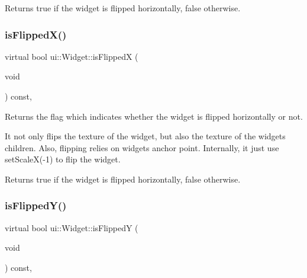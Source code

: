 \begin{DoxyReturn}{Returns}
true if the widget is flipped horizontally, false otherwise. 
\end{DoxyReturn}
\mbox{\label{classui_1_1Widget_aa21dc6a63ebb20bc0dc78293d0f03256}} 
\subsubsection{\texorpdfstring{is\+Flipped\+X()}{isFlippedX()}\hspace{0.1cm}{\footnotesize\ttfamily [2/2]}}
{\footnotesize\ttfamily virtual bool ui\+::\+Widget\+::is\+FlippedX (\begin{DoxyParamCaption}\item[{void}]{ }\end{DoxyParamCaption}) const\hspace{0.3cm}{\ttfamily [inline]}, {\ttfamily [virtual]}}

Returns the flag which indicates whether the widget is flipped horizontally or not.

It not only flips the texture of the widget, but also the texture of the widget\textquotesingle{}s children. Also, flipping relies on widget\textquotesingle{}s anchor point. Internally, it just use set\+ScaleX(-\/1) to flip the widget.

\begin{DoxyReturn}{Returns}
true if the widget is flipped horizontally, false otherwise. 
\end{DoxyReturn}
\mbox{\label{classui_1_1Widget_a25f551f2348e0f7b953d682045b10325}} 
\subsubsection{\texorpdfstring{is\+Flipped\+Y()}{isFlippedY()}\hspace{0.1cm}{\footnotesize\ttfamily [1/2]}}
{\footnotesize\ttfamily virtual bool ui\+::\+Widget\+::is\+FlippedY (\begin{DoxyParamCaption}\item[{void}]{ }\end{DoxyParamCaption}) const\hspace{0.3cm}{\ttfamily [inline]}, {\ttfamily [virtual]}}

